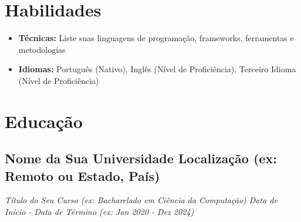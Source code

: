 \documentclass[a4paper,10pt]{article}
\begin{document}

\section{Habilidades}
    \begin{itemize}
        \item \textbf{Técnicas:} Liste suas linguagens de programação, frameworks, ferramentas e metodologias
        \item \textbf{Idiomas:} Português (Nativo), Inglês (Nível de Proficiência), Terceiro Idioma (Nível de Proficiência)
    \end{itemize}



\section{Educação}
    \subsection*{\texorpdfstring{
            \textbf{Nome da Sua Universidade} \hfill Localização (ex: Remoto ou Estado, País)
        }{
            Nome da Sua Universidade (Educação) -- Localização
        }}
    \textit{Título do Seu Curso (ex: Bacharelado em Ciência da Computação) \hfill Data de Início - Data de Término (ex: Jan 2020 - Dez 2024)}
\end{document}
